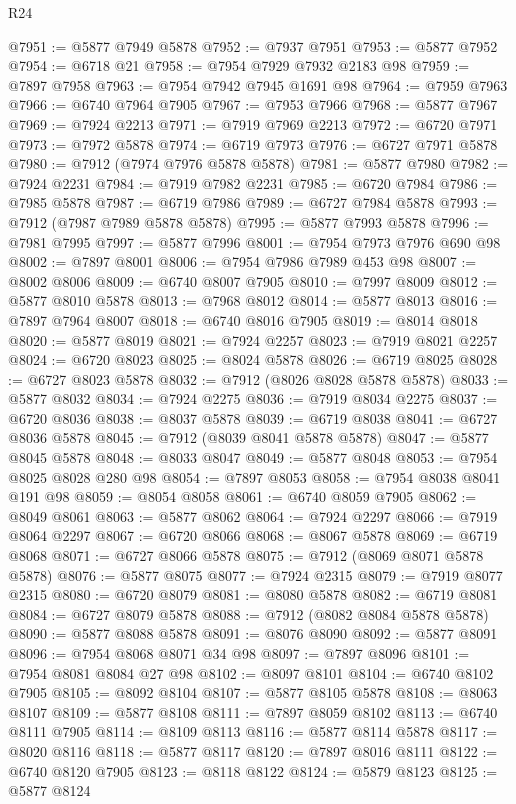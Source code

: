 \begin{lexlean}{R24}
\begin{coremodule}
@7951 := @5877 @7949 @5878
@7952 := @7937 @7951
@7953 := @5877 @7952
@7954 := @6718 @21
@7958 := @7954 @7929 @7932 @2183 @98
@7959 := @7897 @7958
@7963 := @7954 @7942 @7945 @1691 @98
@7964 := @7959 @7963
@7966 := @6740 @7964 @7905
@7967 := @7953 @7966
@7968 := @5877 @7967
@7969 := @7924 @2213
@7971 := @7919 @7969 @2213
@7972 := @6720 @7971
@7973 := @7972 @5878
@7974 := @6719 @7973
@7976 := @6727 @7971 @5878
@7980 := @7912 (@7974 @7976 @5878 @5878)
@7981 := @5877 @7980
@7982 := @7924 @2231
@7984 := @7919 @7982 @2231
@7985 := @6720 @7984
@7986 := @7985 @5878
@7987 := @6719 @7986
@7989 := @6727 @7984 @5878
@7993 := @7912 (@7987 @7989 @5878 @5878)
@7995 := @5877 @7993 @5878
@7996 := @7981 @7995
@7997 := @5877 @7996
@8001 := @7954 @7973 @7976 @690 @98
@8002 := @7897 @8001
@8006 := @7954 @7986 @7989 @453 @98
@8007 := @8002 @8006
@8009 := @6740 @8007 @7905
@8010 := @7997 @8009
@8012 := @5877 @8010 @5878
@8013 := @7968 @8012
@8014 := @5877 @8013
@8016 := @7897 @7964 @8007
@8018 := @6740 @8016 @7905
@8019 := @8014 @8018
@8020 := @5877 @8019
@8021 := @7924 @2257
@8023 := @7919 @8021 @2257
@8024 := @6720 @8023
@8025 := @8024 @5878
@8026 := @6719 @8025
@8028 := @6727 @8023 @5878
@8032 := @7912 (@8026 @8028 @5878 @5878)
@8033 := @5877 @8032
@8034 := @7924 @2275
@8036 := @7919 @8034 @2275
@8037 := @6720 @8036
@8038 := @8037 @5878
@8039 := @6719 @8038
@8041 := @6727 @8036 @5878
@8045 := @7912 (@8039 @8041 @5878 @5878)
@8047 := @5877 @8045 @5878
@8048 := @8033 @8047
@8049 := @5877 @8048
@8053 := @7954 @8025 @8028 @280 @98
@8054 := @7897 @8053
@8058 := @7954 @8038 @8041 @191 @98
@8059 := @8054 @8058
@8061 := @6740 @8059 @7905
@8062 := @8049 @8061
@8063 := @5877 @8062
@8064 := @7924 @2297
@8066 := @7919 @8064 @2297
@8067 := @6720 @8066
@8068 := @8067 @5878
@8069 := @6719 @8068
@8071 := @6727 @8066 @5878
@8075 := @7912 (@8069 @8071 @5878 @5878)
@8076 := @5877 @8075
@8077 := @7924 @2315
@8079 := @7919 @8077 @2315
@8080 := @6720 @8079
@8081 := @8080 @5878
@8082 := @6719 @8081
@8084 := @6727 @8079 @5878
@8088 := @7912 (@8082 @8084 @5878 @5878)
@8090 := @5877 @8088 @5878
@8091 := @8076 @8090
@8092 := @5877 @8091
@8096 := @7954 @8068 @8071 @34 @98
@8097 := @7897 @8096
@8101 := @7954 @8081 @8084 @27 @98
@8102 := @8097 @8101
@8104 := @6740 @8102 @7905
@8105 := @8092 @8104
@8107 := @5877 @8105 @5878
@8108 := @8063 @8107
@8109 := @5877 @8108
@8111 := @7897 @8059 @8102
@8113 := @6740 @8111 @7905
@8114 := @8109 @8113
@8116 := @5877 @8114 @5878
@8117 := @8020 @8116
@8118 := @5877 @8117
@8120 := @7897 @8016 @8111
@8122 := @6740 @8120 @7905
@8123 := @8118 @8122
@8124 := @5879 @8123
@8125 := @5877 @8124

\end{coremodule}
\end{lexlean}
